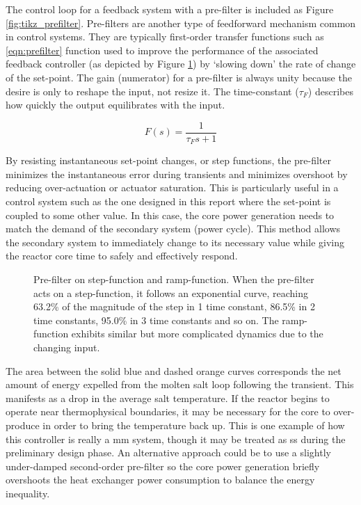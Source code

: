 The control loop for a feedback system with a pre-filter is included as Figure \ref{fig:tikz_prefilter}. Pre-filters are another type of feedforward mechanism common in control systems. They are typically first-order transfer functions such as \ref{eqn:prefilter} function used to improve the performance of the associated feedback controller (as depicted by Figure \ref{fig:pgf_prefilter}) by `slowing down' the rate of change of the set-point. The gain (numerator) for a pre-filter is always unity because the desire is only to reshape the input, not resize it. The time-constant ($\tau_F$) describes how quickly the output equilibrates with the input. 

\begin{equation}\label{eqn:prefilter}
    F(s)=\frac{1}{\tau_F s+1}    
\end{equation}

By resisting instantaneous set-point changes, or step functions, the pre-filter minimizes the instantaneous error during transients and minimizes overshoot by reducing over-actuation or actuator saturation.  This is particularly useful in a control system such as the one designed in this report where the set-point is coupled to some other value. In this case, the core power generation needs to match the demand of the secondary system (\eg power cycle). This method allows the secondary system to immediately change to its necessary value while giving the reactor core time to safely and effectively respond. 

\begin{figure}[!ht]
    \centering
    \qquad
    \caption[Pre-filter on (a) step-function and (b) ramp-function]{Pre-filter on step-function and ramp-function. When the pre-filter acts on a step-function, it follows an exponential curve, reaching 63.2\% of the magnitude of the step in 1 time constant, 86.5\% in 2 time constants, 95.0\% in 3 time constants and so on. The ramp-function exhibits similar but more complicated dynamics due to the changing input.}
    \label{fig:pgf_prefilter}
\end{figure}

The area between the solid blue and dashed orange curves corresponds the net amount of energy expelled from the molten salt loop following the transient. This manifests as a drop in the average salt temperature. If the reactor begins to operate near thermophysical boundaries, it may be necessary for the core to over-produce in order to bring the temperature back up. This is one example of how this controller is really a \acf{mm} system, though it may be treated as \acf{ss} during the preliminary design phase. An alternative approach could be to use a slightly under-damped second-order pre-filter so the core power generation briefly overshoots the heat exchanger power consumption to balance the energy inequality.

